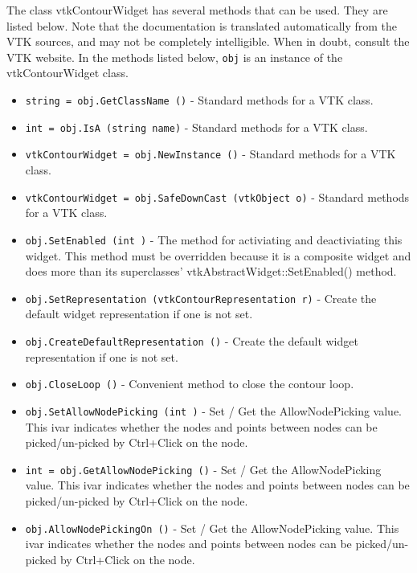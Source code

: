 The class vtkContourWidget has several methods that can be used.
  They are listed below.
Note that the documentation is translated automatically from the VTK sources,
and may not be completely intelligible.  When in doubt, consult the VTK website.
In the methods listed below, \verb|obj| is an instance of the vtkContourWidget class.
\begin{itemize}
\item  \verb|string = obj.GetClassName ()| -  Standard methods for a VTK class.

\item  \verb|int = obj.IsA (string name)| -  Standard methods for a VTK class.

\item  \verb|vtkContourWidget = obj.NewInstance ()| -  Standard methods for a VTK class.

\item  \verb|vtkContourWidget = obj.SafeDownCast (vtkObject o)| -  Standard methods for a VTK class.

\item  \verb|obj.SetEnabled (int )| -  The method for activiating and deactiviating this widget. This method
 must be overridden because it is a composite widget and does more than
 its superclasses' vtkAbstractWidget::SetEnabled() method.

\item  \verb|obj.SetRepresentation (vtkContourRepresentation r)| -  Create the default widget representation if one is not set. 

\item  \verb|obj.CreateDefaultRepresentation ()| -  Create the default widget representation if one is not set. 

\item  \verb|obj.CloseLoop ()| -  Convenient method to close the contour loop.

\item  \verb|obj.SetAllowNodePicking (int )| -  Set / Get the AllowNodePicking value. This ivar indicates whether the nodes
 and points between nodes can be picked/un-picked by Ctrl+Click on the node.

\item  \verb|int = obj.GetAllowNodePicking ()| -  Set / Get the AllowNodePicking value. This ivar indicates whether the nodes
 and points between nodes can be picked/un-picked by Ctrl+Click on the node.

\item  \verb|obj.AllowNodePickingOn ()| -  Set / Get the AllowNodePicking value. This ivar indicates whether the nodes
 and points between nodes can be picked/un-picked by Ctrl+Click on the node.


\end{itemize}
